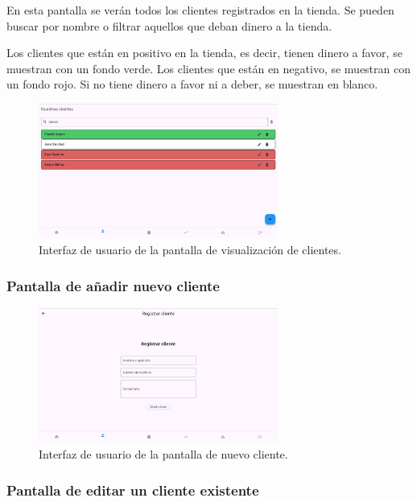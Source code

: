En esta pantalla se verán todos los clientes registrados en la tienda. Se pueden buscar por nombre o filtrar aquellos que deban dinero a la tienda. 

Los clientes que están en positivo en la tienda, es decir, tienen dinero a favor, se muestran con un fondo verde. Los clientes que están en negativo, se muestran con un fondo rojo. Si no tiene dinero a favor ni a deber, se muestran en blanco. 

\begin{figure}[H]
	\centering
	\includegraphics[width=0.7\textwidth]{imagenes/PrimeraIteracion/visualizacionClientes.png}
	\caption{Interfaz de usuario de la pantalla de visualización de clientes.}
	\label{fig:appVisualizarClientes}
\end{figure}

\subsubsection{Pantalla de añadir nuevo cliente}

\begin{figure}[H]
	\centering
	\includegraphics[width=0.7\textwidth]{imagenes/PrimeraIteracion/nuevoCliente.png}
	\caption{Interfaz de usuario de la pantalla de nuevo cliente.}
	\label{fig:appNuevoCliente}
\end{figure}

\subsubsection{Pantalla de editar un cliente existente}

